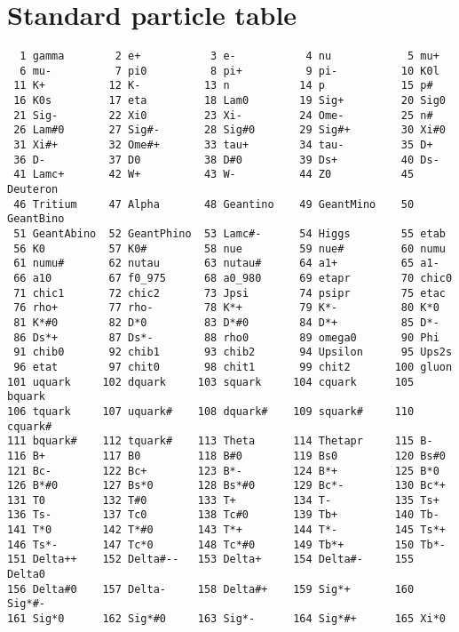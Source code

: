 \chapter{\label{sec-STP}Standard particle table}
\par
\begin{verbatim}
  1 gamma        2 e+           3 e-           4 nu            5 mu+
  6 mu-          7 pi0          8 pi+          9 pi-          10 K0l
 11 K+          12 K-          13 n           14 p            15 p#
 16 K0s         17 eta         18 Lam0        19 Sig+         20 Sig0
 21 Sig-        22 Xi0         23 Xi-         24 Ome-         25 n#
 26 Lam#0       27 Sig#-       28 Sig#0       29 Sig#+        30 Xi#0
 31 Xi#+        32 Ome#+       33 tau+        34 tau-         35 D+
 36 D-          37 D0          38 D#0         39 Ds+          40 Ds-
 41 Lamc+       42 W+          43 W-          44 Z0           45 Deuteron
 46 Tritium     47 Alpha       48 Geantino    49 GeantMino    50 GeantBino
 51 GeantAbino  52 GeantPhino  53 Lamc#-      54 Higgs        55 etab
 56 K0          57 K0#         58 nue         59 nue#         60 numu
 61 numu#       62 nutau       63 nutau#      64 a1+          65 a1-
 66 a10         67 f0_975      68 a0_980      69 etapr        70 chic0
 71 chic1       72 chic2       73 Jpsi        74 psipr        75 etac
 76 rho+        77 rho-        78 K*+         79 K*-          80 K*0
 81 K*#0        82 D*0         83 D*#0        84 D*+          85 D*-
 86 Ds*+        87 Ds*-        88 rho0        89 omega0       90 Phi
 91 chib0       92 chib1       93 chib2       94 Upsilon      95 Ups2s
 96 etat        97 chit0       98 chit1       99 chit2       100 gluon
101 uquark     102 dquark     103 squark     104 cquark      105 bquark
106 tquark     107 uquark#    108 dquark#    109 squark#     110 cquark#
111 bquark#    112 tquark#    113 Theta      114 Thetapr     115 B-
116 B+         117 B0         118 B#0        119 Bs0         120 Bs#0
121 Bc-        122 Bc+        123 B*-        124 B*+         125 B*0
126 B*#0       127 Bs*0       128 Bs*#0      129 Bc*-        130 Bc*+
131 T0         132 T#0        133 T+         134 T-          135 Ts+
136 Ts-        137 Tc0        138 Tc#0       139 Tb+         140 Tb-
141 T*0        142 T*#0       143 T*+        144 T*-         145 Ts*+
146 Ts*-       147 Tc*0       148 Tc*#0      149 Tb*+        150 Tb*-
151 Delta++    152 Delta#--   153 Delta+     154 Delta#-     155 Delta0
156 Delta#0    157 Delta-     158 Delta#+    159 Sig*+       160 Sig*#-
161 Sig*0      162 Sig*#0     163 Sig*-      164 Sig*#+      165 Xi*0

\end{verbatim}
